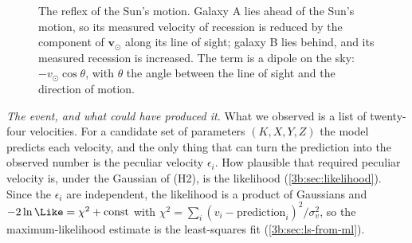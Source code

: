 \begin{figure}[htbp]
\centering
{}
\caption{The reflex of the Sun's motion. Galaxy A lies ahead of the Sun's motion,
so its measured velocity of recession is reduced by the component of
$\bm v_\odot$ along its line of sight; galaxy B lies behind, and its measured
recession is increased. The term is a dipole on the sky: $-v_\odot\cos\theta$, with
$\theta$ the angle between the line of sight and the direction of motion.}
\label{11c:fig:solar-motion}
\end{figure}

\emph{The event, and what could have produced it.} What we observed is a list of
twenty-four velocities. For a candidate set of parameters $(K,X,Y,Z)$ the model
predicts each velocity, and the only thing that can turn the prediction into the
observed number is the peculiar velocity $\epsilon_i$. How plausible that required
peculiar velocity is, under the Gaussian of (H2), is the likelihood
(\cref{3b:sec:likelihood}). Since the $\epsilon_i$ are independent, the likelihood
is a product of Gaussians and $-2\ln\Like=\chi^2+\text{const}$ with
$\chi^2=\sum_i(v_i-\text{prediction}_i)^2/\sigma_v^2$, so the maximum-likelihood
estimate is the least-squares fit (\cref{3b:sec:ls-from-ml}).

